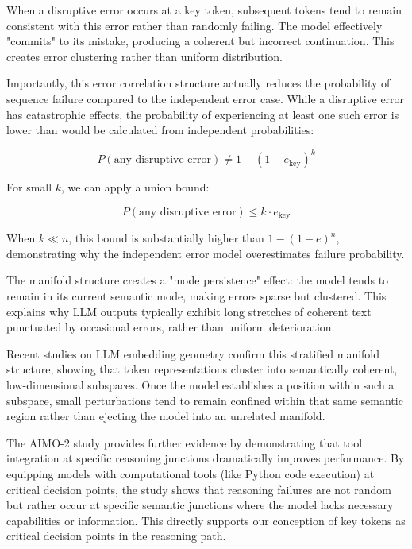 \documentclass{article}
\begin{document}
When a disruptive error occurs at a key token, subsequent tokens tend to remain consistent with this error rather than randomly failing. The model effectively "commits" to its mistake, producing a coherent but incorrect continuation. This creates error clustering rather than uniform distribution.

Importantly, this error correlation structure actually reduces the probability of sequence failure compared to the independent error case. While a disruptive error has catastrophic effects, the probability of experiencing at least one such error is lower than would be calculated from independent probabilities:

\begin{equation}
P(\text{any disruptive error}) \neq 1-(1-e_{\text{key}})^k
\end{equation}

For small $k$, we can apply a union bound:

\begin{equation}
P(\text{any disruptive error}) \leq k \cdot e_{\text{key}}
\end{equation}

When $k \ll n$, this bound is substantially higher than $1-(1-e)^n$, demonstrating why the independent error model overestimates failure probability.

The manifold structure creates a "mode persistence" effect: the model tends to remain in its current semantic mode, making errors sparse but clustered. This explains why LLM outputs typically exhibit long stretches of coherent text punctuated by occasional errors, rather than uniform deterioration.

Recent studies on LLM embedding geometry \citep{li2025unraveling} confirm this stratified manifold structure, showing that token representations cluster into semantically coherent, low-dimensional subspaces. Once the model establishes a position within such a subspace, small perturbations tend to remain confined within that same semantic region rather than ejecting the model into an unrelated manifold.

The AIMO-2 study \citep{moshkov2025aimo} provides further evidence by demonstrating that tool integration at specific reasoning junctions dramatically improves performance. By equipping models with computational tools (like Python code execution) at critical decision points, the study shows that reasoning failures are not random but rather occur at specific semantic junctions where the model lacks necessary capabilities or information. This directly supports our conception of key tokens as critical decision points in the reasoning path.
\end{document}
